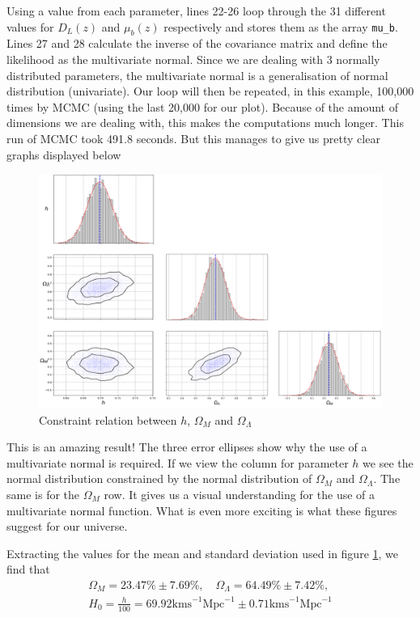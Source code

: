 \documentclass[12pt,twoside]{report}   %
\begin{document}
Using a value from each parameter, lines 22-26 loop through the 31 different values for $D_L(z)$ and $\mu_b(z)$ respectively and stores them as the array \texttt{mu\_b}. Lines 27 and 28 calculate the inverse of the covariance matrix and define the likelihood as the multivariate normal. Since we are dealing with 3 normally distributed parameters, the multivariate normal is a generalisation of normal distribution (univariate). Our loop will then be repeated, in this example, 100,000 times by MCMC (using the last 20,000 for our plot). Because of the amount of dimensions we are dealing with, this makes the computations much longer. This run of MCMC took 491.8 seconds. But this manages to give us pretty clear graphs displayed below
\begin{figure}[H]
\centering
\includegraphics[width = 6in]{triangle.png}
\caption{Constraint relation between $h$, $\Omega_M$ and $\Omega_\Lambda$}
\label{figConstraint}
\end{figure}

This is an amazing result! The three error ellipses show why the use of a multivariate normal is required. If we view the column for parameter $h$ we see the normal distribution constrained by the normal distribution of $\Omega_M$ and $\Omega_\Lambda$. The same is for the $\Omega_M$ row. It gives us a visual understanding for the use of a multivariate normal function. What is even more exciting is what these figures suggest for our universe. 
\pagebreak

Extracting the values for the mean and standard deviation used in figure \ref{figConstraint}, we find that
\begin{align*}
\Omega_M = 23.47\% \pm 7.69\%,\quad\Omega_\Lambda = 64.49\% \pm 7.42\%,\\
H_0 = \frac{h}{100} = 69.92\mathrm{kms}^{-1}\mathrm{Mpc}^{-1} \pm 0.71\mathrm{kms}^{-1}\mathrm{Mpc}^{-1}
\end{align*}
\end{document}
